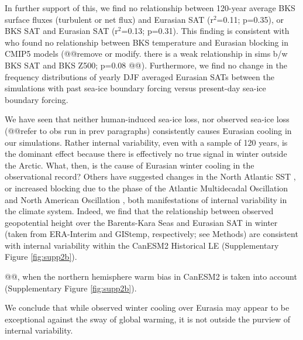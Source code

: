 \documentclass{nature}
\begin{document}
In further support of this, we find no relationship between 120-year average BKS surface fluxes (turbulent or net flux) and Eurasian SAT (r$^2$=0.11; p=0.35), or BKS SAT and Eurasian SAT (r$^2$=0.13; p=0.31). This finding is consistent with \cite{woollings14} who found no relationship between BKS temperature and Eurasian blocking in CMIP5 models (@@remove or modify. there is a weak relationship in sims b/w BKS SAT and BKS Z500; p=0.08 @@). Furthermore, we find no change in the frequency distributions of yearly DJF averaged Eurasian SATs between the simulations with past sea-ice boundary forcing versus present-day sea-ice boundary forcing. 

We have seen that neither human-induced sea-ice loss, nor observed sea-ice loss (@@refer to obs run in prev paragraphs) consistently causes Eurasian cooling in our simulations. Rather internal variability, even with a sample of 120 years, is the dominant effect because there is effectively no true signal in winter outside the Arctic. What, then, is the cause of Eurasian winter cooling in the observational record? Others have suggested changes in the North Atlantic SST \cite{sato14}, or increased blocking due to the phase of the Atlantic Multidecadal Oscillation and North American Oscillation \cite{peings14b}, both manifestations of internal variability in the climate system. Indeed, we find that the relationship between observed geopotential height over the Barents-Kara Seas and Eurasian SAT in winter (taken from ERA-Interim and GIStemp, respectively; see Methods) are consistent with internal variability within the CanESM2 Historical LE (Supplementary Figure \ref{fig:supp2b}). 

@@, when the northern hemisphere warm bias in CanESM2 is taken into account (Supplementary Figure \ref{fig:supp2b}). 

We conclude that while observed winter cooling over Eurasia may appear to be exceptional against the sway of global warming, it is not outside the purview of internal variability.

\end{document}
